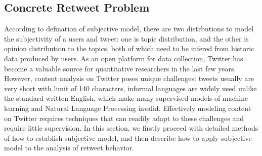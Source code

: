 \documentclass{acm_proc_article-sp}
\begin{document}
\subsection{Concrete Retweet Problem}
According to defination of subjective model, there are two distrbutions to model the subjectivity of a users and tweet: one is topic distribution, and the other is opinion distribution to the topics, both of which need to be infered from historic data produced by users.
As an open platform for data collection, Twitter has become a valuable source for quantitative researchers in the last few years.
However, content analysis on Twitter poses unique challenges: tweets usually are very short with limit of 140 characters, informal languages are widely used unlike the standard written English, which make many supervised models of machine learning and Natural Language Processing invalid. 
Effectively modeling content on Twitter requires techniques that can readily adapt to these challenges and require little supervision.
In this section, we firstly proceed with detailed methods of how to establish subjective model, and then describe how to apply subjective model to the analysis of retweet behavior.
\end{document}
